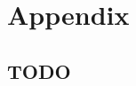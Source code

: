 {
\appendix
\chapter{Appendix}
\renewcommand\thesection{A.\arabic{section}}
\renewcommand{\theequation}{A.\arabic{equation}}
\renewcommand{\thefigure}{A.\arabic{figure}}

\section{TODO}

}
